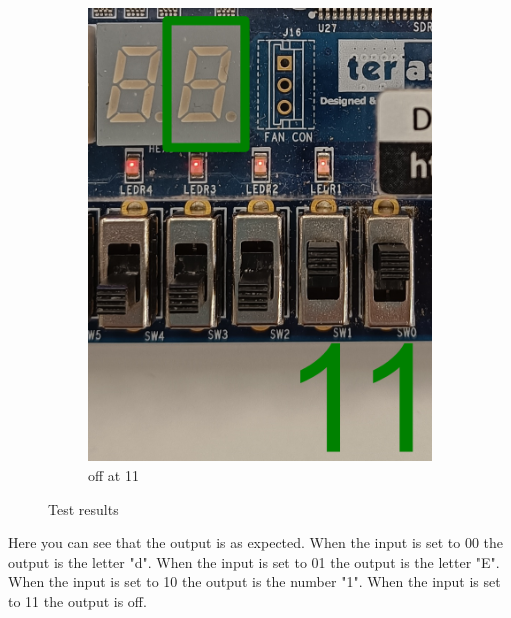 \documentclass{article}
\begin{document}
\begin{figure}[h]
\begin{subfigure}{0.4\textwidth}
        \includegraphics[width=1\textwidth]{Figures/Part4_11.png}
        \caption{off at 11}
        \label{fig:T04pic4}
    \end{subfigure}
    \caption{Test results}
    \label{fig:T04pic}
\end{figure}
Here you can see that the output is as expected. When the input is set to 00 the output is the letter "d". When the input is set to 01 the output is the letter "E". When the input is set to 10 the output is the number "1". When the input is set to 11 the output is off.


\end{document}
